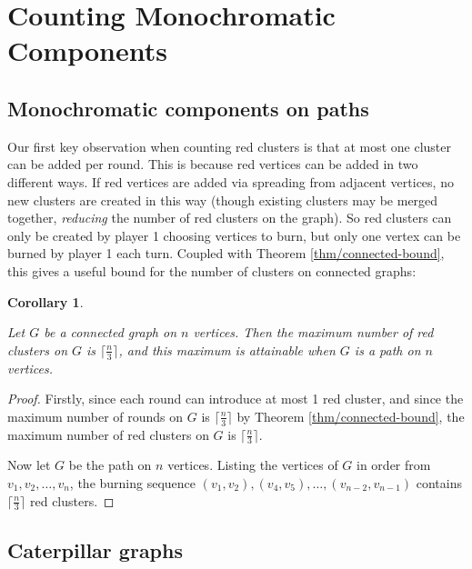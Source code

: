 \documentclass{mpaper}
\newtheorem{corollary}{Corollary}[section]
\begin{document}
\section{Counting Monochromatic Components}

\subsection{Monochromatic components on paths}

Our first key observation when counting red clusters is that at most one cluster can be added per round. This is because red vertices can be added in two different ways. If red vertices are added via spreading from adjacent vertices, no new clusters are created in this way (though existing clusters may be merged together, \emph{reducing} the number of red clusters on the graph). So red clusters can only be created by player 1 choosing vertices to burn, but only one vertex can be burned by player 1 each turn. Coupled with Theorem \ref{thm/connected-bound}, this gives a useful bound for the number of clusters on connected graphs:

\begin{corollary}
  \label{cor/path-clusters}

  Let $G$ be a connected graph on $n$ vertices. Then the maximum number of red clusters on $G$ is $\lceil \frac{n}{3} \rceil$, and this maximum is attainable when $G$ is a path on $n$ vertices.

\end{corollary}

\begin{proof}

Firstly, since each round can introduce at most 1 red cluster, and since the maximum number of rounds on $G$ is $\lceil \frac{n}{3} \rceil$ by Theorem \ref{thm/connected-bound}, the maximum number of red clusters on $G$ is $\lceil \frac{n}{3} \rceil$.

Now let $G$ be the path on $n$ vertices. Listing the vertices of $G$ in order from $v_1, v_2, \dots, v_n$, the burning sequence $(v_1, v_2), (v_4, v_5), \dots, (v_{n-2}, v_{n-1})$ contains $\lceil \frac{n}{3} \rceil$ red clusters.


\end{proof}

\subsection{Caterpillar graphs}
\end{document}
